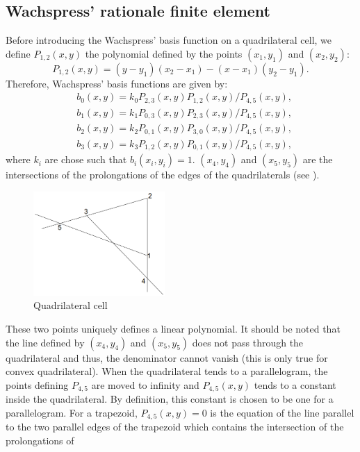 \subsection{Wachspress' rationale finite element}
Before introducing the Wachspress' basis function on a quadrilateral cell, 
we define $P_{1,2}(x,y)$ the polynomial defined by the points $(x_1,y_1)$ and
$(x_2,y_2)$:
\begin{equation}
  P_{1,2}(x,y) = (y-y_1) (x_2-x_1)-(x-x_1)(y_2-y_1).
\end{equation}  
Therefore, Wachspress' basis functions are given by:
\begin{align}
  &b_0(x,y) = k_0 P_{2,3}(x,y)P_{1,2}(x,y)/P_{4,5}(x,y),\\
  &b_1(x,y) = k_1 P_{0,3}(x,y)P_{2,3}(x,y)/P_{4,5}(x,y),\\
  &b_2(x,y) = k_2 P_{0,1}(x,y)P_{3,0}(x,y)/P_{4,5}(x,y),\\
  &b_3(x,y) = k_3 P_{1,2}(x,y)P_{0,1}(x,y)/P_{4,5}(x,y),
\end{align}
where $k_i$ are chose such that $b_i(x_i,y_i)=1$. $(x_4,y_4)$ and $(x_5,y_5)$
are the intersections of the prolongations of the edges 
of the quadrilaterals (see ).
\begin{figure}[H]
  \centering
  \includegraphics[width=5cm]{quadrilateral}
  \caption{Quadrilateral cell}
  \label{fig_quadrilateral}
\end{figure}
These two points uniquely defines a linear polynomial. It should be noted that 
the line defined by $(x_4,y_4)$ and $(x_5,y_5)$ does not pass through the 
quadrilateral and thus, the denominator cannot vanish (this is 
only true for convex quadrilateral). When the quadrilateral tends to a 
parallelogram, the points defining $P_{4,5}$ are moved to infinity and 
$P_{4,5}(x,y)$ tends to a constant inside the quadrilateral. By definition, 
this constant is chosen to be one for a parallelogram. For a trapezoid,
$P_{4,5}(x,y)=0$ is the equation of the line parallel to the two parallel
edges of the trapezoid which contains the intersection of the prolongations of
